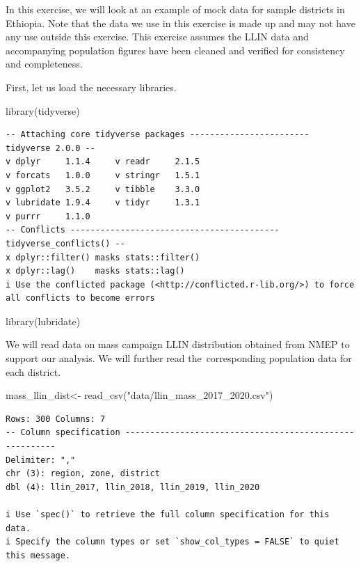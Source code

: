 \documentclass[
  letterpaper,
  DIV=11,
  numbers=noendperiod]{scrreprt}
\newenvironment{Shaded}{\begin{snugshade}}{\end{snugshade}}
\newcommand{\FunctionTok}[1]{\textcolor[rgb]{0.28,0.35,0.67}{#1}}
\newcommand{\NormalTok}[1]{\textcolor[rgb]{0.00,0.23,0.31}{#1}}
\newcommand{\OtherTok}[1]{\textcolor[rgb]{0.00,0.23,0.31}{#1}}
\newcommand{\StringTok}[1]{\textcolor[rgb]{0.13,0.47,0.30}{#1}}
\begin{document}
In this exercise, we will look at an example of mock data for sample
districts in Ethiopia. Note that the data we use in this exercise is
made up and may not have any use outside this exercise. This exercise
assumes the LLIN data and accompanying population figures have been
cleaned and verified for consistency and completeness.

First, let us load the necessary libraries.~~~

\begin{Shaded}
\begin{Highlighting}[]
\FunctionTok{library}\NormalTok{(tidyverse)}
\end{Highlighting}
\end{Shaded}

\begin{verbatim}
-- Attaching core tidyverse packages ------------------------ tidyverse 2.0.0 --
v dplyr     1.1.4     v readr     2.1.5
v forcats   1.0.0     v stringr   1.5.1
v ggplot2   3.5.2     v tibble    3.3.0
v lubridate 1.9.4     v tidyr     1.3.1
v purrr     1.1.0     
-- Conflicts ------------------------------------------ tidyverse_conflicts() --
x dplyr::filter() masks stats::filter()
x dplyr::lag()    masks stats::lag()
i Use the conflicted package (<http://conflicted.r-lib.org/>) to force all conflicts to become errors
\end{verbatim}

\begin{Shaded}
\begin{Highlighting}[]
\FunctionTok{library}\NormalTok{(lubridate)}
\end{Highlighting}
\end{Shaded}

We will read data on mass campaign LLIN distribution obtained from NMEP
to support our analysis. We will further read the~corresponding
population data for each district.

\begin{Shaded}
\begin{Highlighting}[]
\NormalTok{mass\_llin\_dist}\OtherTok{\textless{}{-}} \FunctionTok{read\_csv}\NormalTok{(}\StringTok{"data/llin\_mass\_2017\_2020.csv"}\NormalTok{) }
\end{Highlighting}
\end{Shaded}

\begin{verbatim}
Rows: 300 Columns: 7
-- Column specification --------------------------------------------------------
Delimiter: ","
chr (3): region, zone, district
dbl (4): llin_2017, llin_2018, llin_2019, llin_2020

i Use `spec()` to retrieve the full column specification for this data.
i Specify the column types or set `show_col_types = FALSE` to quiet this message.
\end{verbatim}
\end{document}
